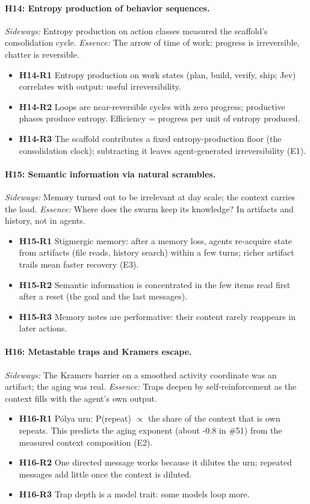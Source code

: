 \documentclass[aps,pre,reprint,10pt,nofootinbib]{revtex4-2}
\begin{document}
\paragraph{H14: Entropy production of behavior sequences.} \emph{Sideways:} Entropy production on action classes measured the scaffold's consolidation cycle. \emph{Essence:} The arrow of time of work: progress is irreversible, chatter is reversible.
\begin{itemize}\setlength{\itemsep}{0pt}
\item \textbf{H14-R1} Entropy production on work states (plan, build, verify, ship; Jev) correlates with output: useful irreversibility.
\item \textbf{H14-R2} Loops are near-reversible cycles with zero progress; productive phases produce entropy. Efficiency = progress per unit of entropy produced.
\item \textbf{H14-R3} The scaffold contributes a fixed entropy-production floor (the consolidation clock); subtracting it leaves agent-generated irreversibility (E1).
\end{itemize}
\paragraph{H15: Semantic information via natural scrambles.} \emph{Sideways:} Memory turned out to be irrelevant at day scale; the context carries the load. \emph{Essence:} Where does the swarm keep its knowledge? In artifacts and history, not in agents.
\begin{itemize}\setlength{\itemsep}{0pt}
\item \textbf{H15-R1} Stigmergic memory: after a memory loss, agents re-acquire state from artifacts (file reads, history search) within a few turns; richer artifact trails mean faster recovery (E3).
\item \textbf{H15-R2} Semantic information is concentrated in the few items read first after a reset (the goal and the last messages).
\item \textbf{H15-R3} Memory notes are performative: their content rarely reappears in later actions.
\end{itemize}
\paragraph{H16: Metastable traps and Kramers escape.} \emph{Sideways:} The Kramers barrier on a smoothed activity coordinate was an artifact; the aging was real. \emph{Essence:} Traps deepen by self-reinforcement as the context fills with the agent's own output.
\begin{itemize}\setlength{\itemsep}{0pt}
\item \textbf{H16-R1} Pólya urn: P(repeat) $\propto$ the share of the context that is own repeats. This predicts the aging exponent (about -0.8 in \#51) from the measured context composition (E2).
\item \textbf{H16-R2} One directed message works because it dilutes the urn; repeated messages add little once the context is diluted.
\item \textbf{H16-R3} Trap depth is a model trait: some models loop more.
\end{itemize}
\end{document}
